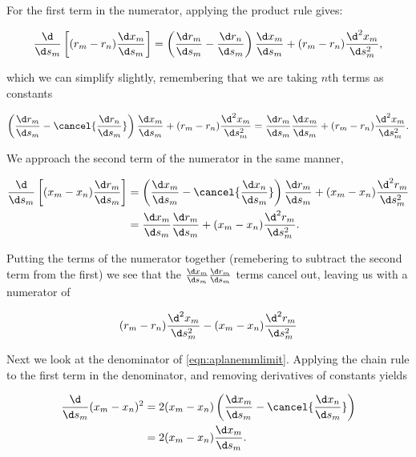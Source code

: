 For the first term in the numerator, applying the product rule gives:

\begin{equation}
	\frac{\d}{\d s_m} \left[ (r_m-r_n)\frac{\d x_m}{\d s_m}\right] = \left(\frac{\d r_m}{\d s_m} - \frac{\d r_n}{\d s_m} \right) \frac{\d x_m}{\d s_m} + (r_m-r_n)\frac{\d^2 x_m}{\d s_m^2},
\end{equation}

\noindent which we can simplify slightly, remembering that we are taking \(n\)th terms as constants

\begin{equation}
	\left(\frac{\d r_m}{\d s_m} - \cancel{\frac{\d r_n}{\d s_m}} \right) \frac{\d x_m}{\d s_m} + (r_m-r_n)\frac{\d^2 x_m}{\d s_m^2} =  \frac{\d r_m}{\d s_m} \frac{\d x_m}{\d s_m} + (r_m-r_n)\frac{\d^2 x_m}{\d s_m^2}.
\end{equation}

We approach the second term of the numerator in the same manner,

\begin{equation}
	\begin{aligned}
		\frac{\d}{\d s_m} \left[ (x_m-x_n)\frac{\d r_m}{\d s_m}\right] &= \left(\frac{\d x_m}{\d s_m} - \cancel{\frac{\d x_n}{\d s_m}} \right) \frac{\d r_m}{\d s_m} + (x_m-x_n)\frac{\d^2 r_m}{\d s_m^2}\\
		&= \frac{\d x_m}{\d s_m} \frac{\d r_m}{\d s_m} + (x_m-x_n)\frac{\d^2 r_m}{\d s_m^2}.
	\end{aligned}
\end{equation}

\noindent Putting the terms of the numerator together (remebering to subtract the second term from the first) we see that the \(\frac{\d x_m}{\d s_m} \frac{\d r_m}{\d s_m}\) terms cancel out, leaving us with a numerator of

\begin{equation}
	(r_m-r_n)\frac{\d^2 x_m}{\d s_m^2} - (x_m-x_n)\frac{\d^2 r_m}{\d s_m^2}
\end{equation}

Next we look at the denominator of \cref{eqn:aplanemmlimit}.
Applying the chain rule to the first term in the denominator, and removing derivatives of constants yields

\begin{equation}
	\begin{aligned}
		\frac{\d}{\d s_m} (x_m-x_n)^2 &= 2(x_m-x_n)\left(\frac{\d x_m}{\d s_m}-\cancel{\frac{\d x_n}{\d s_m}}\right)\\
		&= 2(x_m-x_n)\frac{\d x_m}{\d s_m}.
	\end{aligned}
\end{equation}

